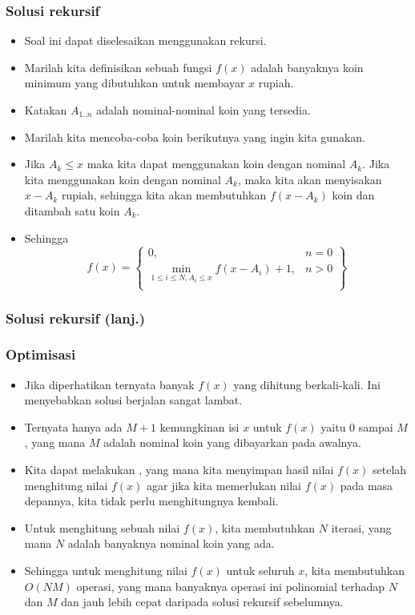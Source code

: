 \begin{frame}
\frametitle{Solusi rekursif}
\begin{itemize}
  \item Soal ini dapat diselesaikan menggunakan rekursi.
  \item Marilah kita definisikan sebuah fungsi $f(x)$ adalah banyaknya koin minimum yang dibutuhkan untuk membayar $x$ rupiah.
  \item Katakan $A_{1..n}$ adalah nominal-nominal koin yang tersedia.
  \item Marilah kita mencoba-coba koin berikutnya yang ingin kita gunakan.
  \item Jika $A_k \leq x$ maka kita dapat menggunakan koin dengan nominal $A_k$. Jika kita menggunakan koin dengan nominal $A_k$, maka kita akan menyisakan $x - A_k$ rupiah, sehingga kita akan membutuhkan $f(x-A_k)$ koin dan ditambah satu koin $A_k$.
   \item Sehingga 
   \[f(x) = \left\{\begin{array}{lr}
        0, & n = 0\\
        \min_{1 \leq i \leq N, A_i \leq x} {f(x - A_i) + 1}, & n > 0\\
        \end{array}\right\}\]
 \end{itemize}
\end{frame}

\begin{frame}
\frametitle{Solusi rekursif (lanj.)}
\end{frame}

\begin{frame}
\frametitle{Optimisasi}
\begin{itemize}
  \item Jika diperhatikan ternyata banyak $f(x)$ yang dihitung berkali-kali. Ini menyebabkan solusi berjalan sangat lambat.
  \item Ternyata hanya ada $M + 1$ kemungkinan isi $x$ untuk $f(x)$ yaitu $0$ sampai $M$, yang mana $M$ adalah nominal koin yang dibayarkan pada awalnya.
  \item Kita dapat melakukan , yang mana kita menyimpan hasil nilai $f(x)$ setelah menghitung nilai $f(x)$ agar jika kita memerlukan nilai $f(x)$ pada masa depannya, kita tidak perlu menghitungnya kembali.
  \item Untuk menghitung sebuah nilai $f(x)$, kita membutuhkan $N$ iterasi, yang mana $N$ adalah banyaknya nominal koin yang ada.
  \item Sehingga untuk menghitung nilai $f(x)$ untuk seluruh $x$, kita membutuhkan $O(NM)$ operasi, yang mana banyaknya operasi ini polinomial terhadap $N$ dan $M$ dan jauh lebih cepat daripada solusi rekursif sebelumnya.
\end{itemize}
\end{frame}

